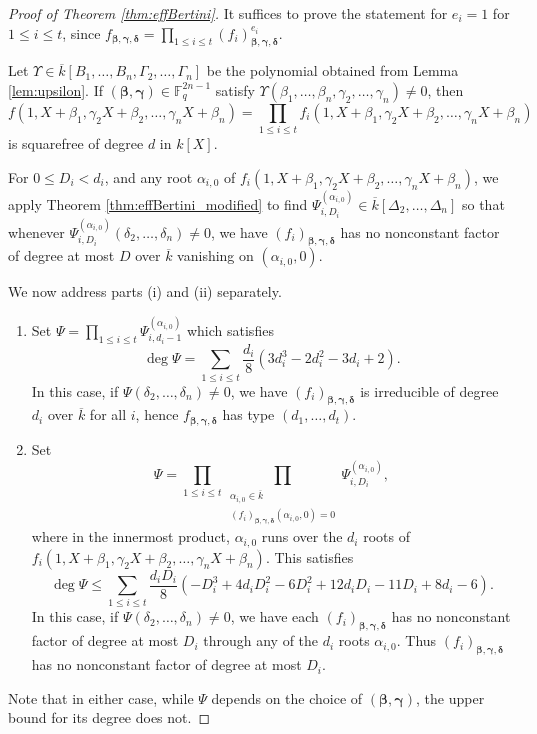 \documentclass{amsart}
\newcommand{\F}{\mathbb{F}}
\renewcommand{\v}{\beta}
\newcommand{\w}{\gamma}
\newcommand{\z}{\delta}
\newcommand{\vvar}{B}
\newcommand{\wvar}{\Gamma}
\newcommand{\zvar}{\Delta}
\newcommand{\bv}{\boldsymbol{\v}}
\newcommand{\bw}{\boldsymbol{\w}}
\newcommand{\bz}{\boldsymbol{\z}}
\newcommand{\fvwz}{f_{\bv, \bw, \bz}}
\theoremstyle{definition}
\numberwithin{equation}{section}
\numberwithin{table}{section}
\begin{document}
\begin{proof}[Proof of Theorem \ref{thm:effBertini}]	
	It suffices to prove the statement for $e_i = 1$ for $1 \leq i \leq t$, since $\fvwz = \prod_{1 \leq i \leq t}(f_i)^{e_i}_{\bv,\bw,\bz}$. 
	
	Let $\Upsilon \in \overline{k}[\vvar_1,\ldots,\vvar_n,\wvar_2,\ldots,\wvar_n]$ be the polynomial obtained from Lemma \ref{lem:upsilon}. If $(\bv,\bw) \in \F_q^{2n-1}$ satisfy $\Upsilon(\v_1,\ldots,\v_n,\w_2,\ldots,\w_n) \neq 0$, then
	\[f(1,X+\v_1,\w_2X +\v_2,\ldots,\w_nX +\v_n) = \prod_{1 \leq i \leq t} f_i(1,X+\v_1,\w_2X +\v_2,\ldots,\w_nX +\v_n)\]
	is squarefree of degree $d$ in $k[X]$.
	
	For $0 \leq D_i < d_i$, and any root $\alpha_{i,0}$ of $f_i(1,X+\v_1,\w_2X +\v_2,\ldots,\w_nX +\v_n)$, we apply Theorem \ref{thm:effBertini_modified} to find $\Psi_{i,D_i}^{(\alpha_{i,0})} \in \overline{k}[\zvar_2,\ldots,\zvar_n]$ so that whenever $\Psi_{i,D_i}^{(\alpha_{i,0})}(\z_2,\ldots,\z_n) \neq 0$, we have $(f_i)_{\bv,\bw,\bz}$ has no nonconstant factor of degree at most $D$ over $\overline{k}$ vanishing on $(\alpha_{i,0},0)$. 
	
	We now address parts (i) and (ii) separately.
	\begin{enumerate}[label = (\roman*)]
		\item Set $\Psi = \prod_{1 \leq i \leq t} \Psi_{i,d_i-1}^{(\alpha_{i,0})}$ which satisfies
		\[\deg \Psi = \sum_{1 \leq i \leq t} \frac{d_i}{8}\left(3d_i^3 - 2d_i^2 - 3d_i + 2\right).\] In this case, if $\Psi(\z_2,\ldots,\z_n) \neq 0$, we have $(f_i)_{\bv,\bw,\bz}$ is irreducible of degree $d_i$ over $\overline{k}$ for all $i$, hence $\fvwz$ has type $(d_1,\ldots,d_t)$. 
		
		\item Set 
		\[\Psi = \prod_{1 \leq i \leq t} \prod_{\substack{\alpha_{i,0} \in \overline{k} \\ (f_i)_{\bv,\bw,\bz}(\alpha_{i,0},0) = 0}} \Psi_{i,D_i}^{(\alpha_{i,0})},\]
        where in the innermost product, $\alpha_{i,0}$ runs over the $d_i$ roots of $f_i(1,X + \v_1, \w_2X + \v_2,\ldots,\w_n X + \v_n)$. This satisfies
		\[\deg \Psi \leq \sum_{1 \leq i \leq t} \frac{d_iD_i}{8}\left(-D_i^3 + 4d_iD_i^2 - 6D_i^2 + 12d_iD_i - 11D_i + 8d_i - 6\right).\]
		In this case, if $\Psi(\z_2,\ldots,\z_n) \neq 0$, we have each $(f_i)_{\bv,\bw,\bz}$ has no nonconstant factor of degree at most $D_i$ through any of the $d_i$ roots $\alpha_{i,0}$. Thus $(f_i)_{\bv,\bw,\bz}$ has no nonconstant factor of degree at most $D_i$.
	\end{enumerate}
Note that in either case, while $\Psi$ depends on the choice of $(\bv,\bw)$, the upper bound for its degree does not.
	

\end{proof}
\end{document}
